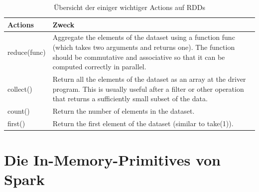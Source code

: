 \begin{table}[!ht]
\centering
\begin{tabular}{| p{5cm} | p{8cm} | }
\hline
Actions & Zweck \\ \hline \hline
reduce(func) & Aggregate the elements of the dataset using a function func (which takes two arguments and returns one). The function should be commutative and associative so that it can be computed correctly in parallel.  \\ \hline 
collect() & Return all the elements of the dataset as an array at the driver program. This is usually useful after a filter or other operation that returns a sufficiently small subset of the data. \\ \hline 
count() & Return the number of elements in the dataset. \\ \hline 
first() & Return the first element of the dataset (similar to take(1)). \\ \hline 
\end{tabular}
\caption{Übersicht der einiger wichtiger Actions auf RDDs}
	\label{tab:actions}
\end{table}

\section{Die In-Memory-Primitives von Spark}
\label{section:in Memory Primvs}

